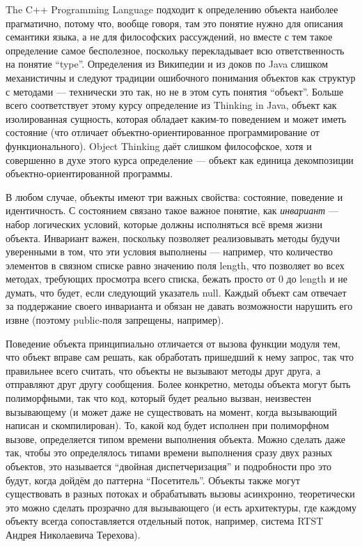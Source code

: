 \documentclass{../../text-style}
\begin{document}
The C++ Programming Language подходит к определению объекта наиболее прагматично, потому что, вообще говоря, там это понятие нужно для описания семантики языка, а не для философских рассуждений, но вместе с тем такое определение самое бесполезное, поскольку перекладывает всю ответственность на понятие ``type''. Определения из Википедии и из доков по Java слишком механистичны и следуют традиции ошибочного понимания объектов как структур с методами --- технически это так, но не в этом суть понятия ``объект''. Больше всего соответствует этому курсу определение из Thinking in Java, объект как изолированная сущность, которая обладает каким-то поведением и может иметь состояние (что отличает объектно-ориентированное программирование от функционального). Object Thinking даёт слишком философское, хотя и совершенно в духе этого курса определение --- объект как единица декомпозиции объектно-ориентированной программы.

В любом случае, объекты имеют три важных свойства: состояние, поведение и идентичность. С состоянием связано такое важное понятие, как \textit{инвариант} --- набор логических условий, которые должны исполняться всё время жизни объекта. Инвариант важен, поскольку позволяет реализовывать методы будучи уверенными в том, что эти условия выполнены --- например, что количество элементов в связном списке равно значению поля length, что позволяет во всех методах, требующих просмотра всего списка, бежать просто от 0 до length и не думать, что будет, если следующий указатель null. Каждый объект сам отвечает за поддержание своего инварианта и обязан не давать возможности нарушить его извне (поэтому public-поля запрещены, например).

Поведение объекта принципиально отличается от вызова функции модуля тем, что объект вправе сам решать, как обработать пришедший к нему запрос, так что правильнее всего считать, что объекты не вызывают методы друг друга, а отправляют друг другу сообщения. Более конкретно, методы объекта могут быть полиморфными, так что код, который будет реально вызван, неизвестен вызывающему (и может даже не существовать на момент, когда вызывающий написан и скомпилирован). То, какой код будет исполнен при полиморфном вызове, определяется типом времени выполнения объекта. Можно сделать даже так, чтобы это определялось типами времени выполнения сразу двух разных объектов, это называется ``двойная диспетчеризация'' и подробности про это будут, когда дойдём до паттерна ``Посетитель''. Объекты также могут существовать в разных потоках и обрабатывать вызовы асинхронно, теоретически это можно сделать прозрачно для вызывающего (и есть архитектуры, где каждому объекту всегда сопоставляется отдельный поток, например, система RTST Андрея Николаевича Терехова).
\end{document}
